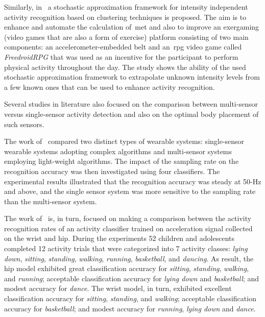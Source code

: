 Similarly, in~\cite{alshurafa_designing_2014} a stochastic approximation framework for intensity independent activity recognition based on clustering techniques is proposed. The aim is to enhance and automate the calculation of~\gls{met} and also to improve an exergaming (video games that are also a form of exercise) platform consisting of two main components: an accelerometer-embedded belt and an~\gls{rpg} video game called \textit{FreedroidRPG} that was used as an incentive for the participant to perform physical activity throughout the day. The study shows the ability of the used stochastic approximation framework to extrapolate unknown intensity levels from a few  known ones that can be used to enhance activity recognition.

Several studies in literature also focused on the comparison between multi-sensor versus single-sensor activity detection and also on the optimal body placement of such sensors.

The work of~\cite{gao_evaluation_2014} compared two distinct types of wearable systems: single-sensor wearable systems adopting complex algorithms and multi-sensor systems employing light-weight algorithms. The impact of the sampling rate on the recognition accuracy was then investigated using four classifiers. The experimental results illustrated that the recognition accuracy was steady at 50-Hz and above, and the single sensor system was more sensitive to the sampling rate than the multi-sensor system.

The work of~\cite{trost_machine_2014} is, in turn, focused on making a comparison between the activity recognition rates of an activity classifier trained on acceleration signal collected on the wrist and hip. During the experiments 52 children and adolescents completed 12 activity trials that were categorized into 7 activity classes: \textit{lying down}, \textit{sitting}, \textit{standing}, \textit{walking}, \textit{running}, \textit{basketball}, and \textit{dancing}. As result, the hip model exhibited great classification accuracy for \textit{sitting}, \textit{standing}, \textit{walking}, and \textit{running}; acceptable classification accuracy for \textit{lying down} and \textit{basketball}; and modest accuracy for \textit{dance}. The wrist model, in turn, exhibited excellent classification accuracy for \textit{sitting}, \textit{standing}, and \textit{walking}; acceptable classification accuracy for \textit{basketball}; and modest accuracy for \textit{running}, \textit{lying down} and \textit{dance}.

